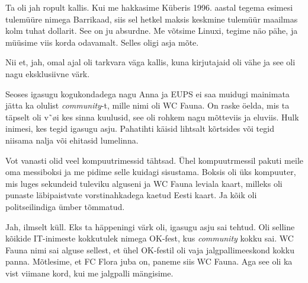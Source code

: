 Ta oli jah ropult kallis. Kui me hakkasime Küberis 1996. aastal tegema  esimesi tulemüüre nimega 
Barrikaad,  siis sel hetkel maksis keskmine tulemüür maailmas 
kolm tuhat dollarit. See on ju absurdne. Me võtsime Linuxi, tegime näo pähe, ja 
müüsime viis korda odavamalt. Selles oligi asja mõte. 

Nii et, jah, omal ajal oli tarkvara väga kallis, kuna kirjutajaid oli vähe ja 
see oli nagu eksklusiivne värk. 

Seoses igasugu kogukondadega nagu Anna ja EUPS ei saa muidugi mainimata jätta 
ka olulist \emph{community}-t, mille nimi oli WC Fauna. On 
raske öelda, mis ta täpselt oli v˜øi kes sinna kuulusid, see oli rohkem nagu 
mõtteviis ja eluviis. Hulk inimesi, kes tegid igasugu asju. Pahatihti käisid  
lihtsalt kõrtsides või tegid niisama nalja või ehitasid lumelinna.

Vot vanasti olid veel kompuutrimessid tähtsad. Ühel kompuutrmessil pakuti meile oma messiboksi ja me pidime selle 
kuidagi sisustama. Boksis oli üks kompuuter, mis luges sekundeid tuleviku 
alguseni ja WC Fauna leviala kaart, milleks oli punaste läbipaistvate 
vorstinahkadega kaetud Eesti kaart. Ja kõik oli politseilindiga ümber tõmmatud. 


Jah, ilmselt küll. Eks ta häppeningi värk oli, igasugu asju sai tehtud. Oli 
selline kõikide IT-inimeste kokkutulek nimega 
OK-fest, 
kus \emph{community} kokku sai. WC Fauna nimi sai alguse sellest, et ühel 
OK-festil oli vaja jalgpallimeeskond kokku panna. Mõtlesime, et FC Flora juba 
on, paneme siis WC Fauna. Aga see oli ka vist viimane kord, kui me jalgpalli 
mängisime. 

